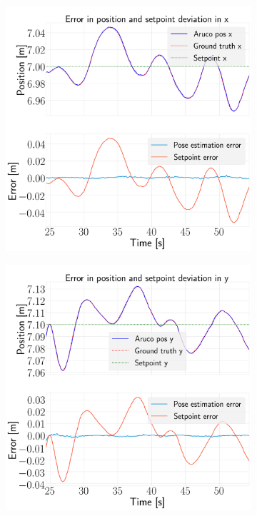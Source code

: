 \documentclass[../Head/report.tex]{subfiles}
\begin{document}
\begin{figure}[H]
    \centering
    \begin{subfigure}[t]{.30\textwidth}
        \centering
        \includegraphics[width=\textwidth]{../Figures/hold_pose_using_aruco_pose_estimation/test5_landingBoard3_noWind/error_x/pose_error_x_test1.png}
        \caption{}
        \label{fig:hold_pose_estimation_test5_x}
    \end{subfigure}
     \hspace{0.2em}
    \begin{subfigure}[t]{.30\textwidth}
        \centering
        \includegraphics[width=\textwidth]{../Figures//hold_pose_using_aruco_pose_estimation/test5_landingBoard3_noWind/error_y/pose_error_y_test1.png}

\end{subfigure}
\end{figure}
\end{document}
